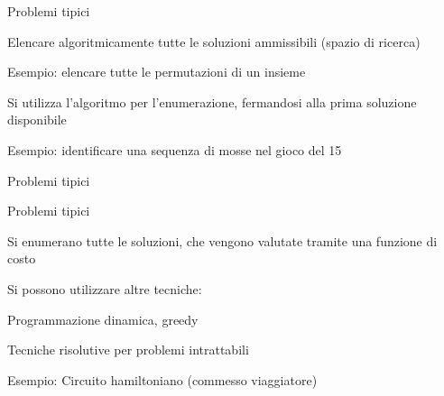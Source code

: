 \begin{frame}{Problemi tipici}

\BIL
\item Elencare algoritmicamente tutte le soluzioni ammissibili (spazio di ricerca)
\item Esempio: elencare tutte le permutazioni di un insieme
\EIL

\medskip
{}
\BIL
\item Si utilizza l'algoritmo per l'enumerazione, fermandosi alla prima soluzione 
disponibile
\item Esempio: identificare una sequenza di mosse nel gioco del 15
\EIL

\end{frame}

\begin{frame}{Problemi tipici}

\smallskip
{}
\end{frame}


\begin{frame}{Problemi tipici}

\BIL
\item Si enumerano tutte le soluzioni, che vengono valutate tramite una
funzione di costo
\item Si possono utilizzare altre tecniche:
	\BI
	\item Programmazione dinamica, greedy
	\item Tecniche risolutive per problemi intrattabili
	\EI
\item Esempio: Circuito hamiltoniano (commesso viaggiatore)
\EIL

\end{frame}

